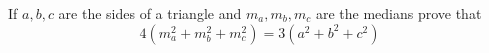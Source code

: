 If $a,b,c$ are the sides of a triangle and $m_a , m_b, m_c$ are the medians prove that
\[4(m_a^2+m_b^2+m_c^2)=3(a^2+b^2+c^2)\]